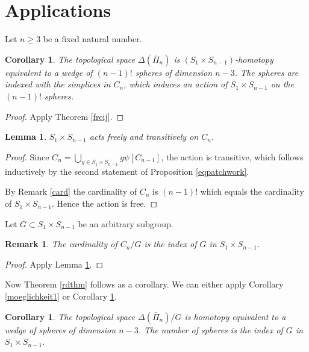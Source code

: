 \documentclass{elsarticle}
\newtheorem{lem}[df]{Lemma}
\newtheorem{cor}[df]{Corollary}
\newtheorem{rem}[df]{Remark}
\begin{document}
\section{Applications}
Let $n\geq 3$ be a fixed natural number.
\begin{cor}
\label{moeglichkeit2}
The topological space $\Delta(\overline{\Pi}_n)$ is $(S_1\times S_{n-1})$-homotopy equivalent to a wedge of $(n-1)!$ spheres of dimension $n-3$. The spheres are indexed with the simplices in $C_n$, which induces an action of $S_1\times S_{n-1}$ on the $(n-1)!$ spheres.
\end{cor}
\begin{proof}
Apply Theorem \ref{freij}.
\end{proof}
\begin{lem}
\label{freetrans}
$S_1\times S_{n-1}$ acts freely and transitively on $C_n$.
\end{lem}
\begin{proof}
Since $C_n=\bigcup_{g\in S_1\times S_{n-1}}g\psi[C_{n-1}]$, the action is transitive, which follows inductively by the second statement of Proposition \ref{eqpatchwork}.

By Remark \ref{card} the cardinality of $C_n$ is $(n-1)!$ which equals the cardinality of $S_1\times S_{n-1}$. Hence the action is free.
\end{proof}
Let $G\subset S_1\times S_{n-1}$ be an arbitrary subgroup.
\begin{rem}
The cardinality of $C_n/G$ is the index of $G$ in $S_1\times S_{n-1}$.
\end{rem}
\begin{proof}
Apply Lemma \ref{freetrans}.
\end{proof}
Now Theorem \ref{rdthm} follows as a corollary. We can either apply Corollary \ref{moeglichkeit1} or Corollary \ref{moeglichkeit2}.
\begin{cor}
The topological space $\Delta(\overline{\Pi}_n)/G$ is homotopy equivalent to a wedge of spheres of dimension $n-3$. The number of spheres is the index of $G$ in $S_1\times S_{n-1}$.
\end{cor}
\end{document}
